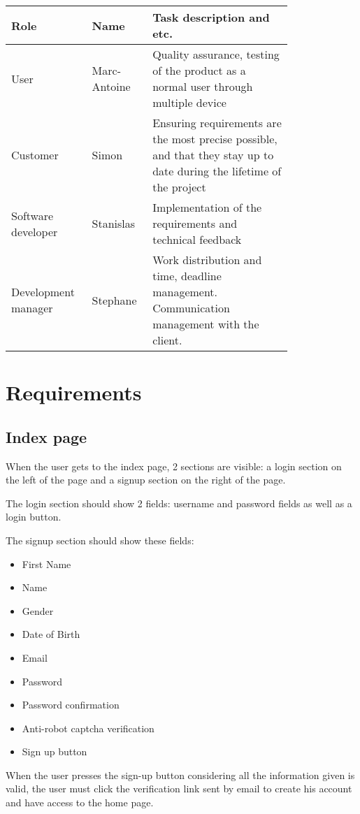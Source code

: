 \documentclass[conference]{IEEEtran}
\begin{document}
\begin{tabular}{ |p{0.2\linewidth}|p{0.15\linewidth}|p{0.45\linewidth}| }
\hline
Role & Name & Task description and etc. \\
\hline
User & Marc-Antoine & Quality assurance, testing of the product as a normal user through multiple device \\
\hline
Customer & Simon & Ensuring requirements are the most precise possible, and that they stay up to date during the lifetime of the project \\
\hline
Software developer & Stanislas & Implementation of the requirements and technical feedback \\
\hline
Development manager & Stephane & Work distribution and time, deadline management. Communication management with the client. \\
\hline
\end{tabular}

\section{Requirements}

\subsection{Index page}

When the user gets to the index page, 2 sections are visible: a login section on the left of the page and a signup section on the right of the page.

The login section should show 2 fields: username and password fields as well as a login button.

The signup section should show these fields:

\begin{itemize}
    \item First Name
    \item Name
    \item Gender
    \item Date of Birth
    \item Email
    \item Password
    \item Password confirmation
    \item Anti-robot captcha verification
    \item Sign up button
\end{itemize}

When the user presses the sign-up button considering all
the information given is valid, the user must click the verification link sent by email to create his account and have access to the home page.
\end{document}
